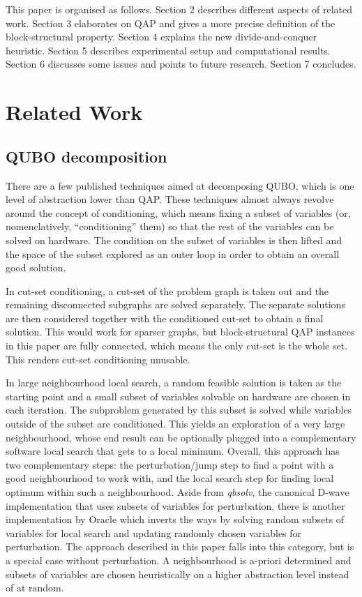 \documentclass[conference]{IEEEtran}
\begin{document}
This paper is organised as follows. Section 2 describes different aspects of related work. Section 3 elaborates on QAP and gives a more precise definition of the block-structural property. Section 4 explains the new divide-and-conquer heuristic. Section 5 describes experimental setup and computational results. Section 6 discusses some issues and points to future research. Section 7 concludes.

\section{Related Work}
\subsection{QUBO decomposition}
\label{decomp}
There are a few published techniques aimed at decomposing QUBO, which is one level of abstraction lower than QAP. These techniques almost always revolve around the concept of conditioning, which means fixing a subset of variables (or, nomenclatively, ``conditioning'' them) so that the rest of the variables can be solved on hardware. The condition on the subset of variables is then lifted and the space of the subset explored as an outer loop in order to obtain an overall good solution.

In cut-set conditioning, a cut-set of the problem graph is taken out and the remaining disconnected subgraphs are solved separately. The separate solutions are then considered together with the conditioned cut-set to obtain a final solution. This would work for sparser graphs, but block-structural QAP instances in this paper are fully connected, which means the only cut-set is the whole set. This renders cut-set conditioning unusable.

In large neighbourhood local search, a random feasible solution is taken as the starting point and a small subset of variables solvable on hardware are chosen in each iteration. The subproblem generated by this subset is solved while variables outside of the subset are conditioned. This yields an exploration of a very large neighbourhood, whose end result can be optionally plugged into a complementary software local search that gets to a local minimum. Overall, this approach has two complementary steps: the perturbation/jump step to find a point with a good neighbourhood to work with, and the local search step for finding local optimum within such a neighbourhood. Aside from \textit{qbsolv}, the canonical D-wave implementation \cite{Booth:2017} that uses subsets of variables for perturbation, there is another implementation by Oracle \cite{Mihic:2018} which inverts the ways by solving random subsets of variables for local search and updating randomly chosen variables for perturbation. The approach described in this paper falls into this category, but is a special case without perturbation. A neighbourhood is a-priori determined and subsets of variables are chosen heuristically on a higher abstraction level instead of at random.
\end{document}
